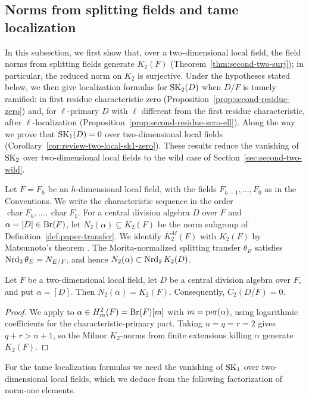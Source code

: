 \subsection{Norms from splitting fields and tame localization}\label{sec:second-two-tame}
In this subsection, we first show that, over a two-dimensional local field, the field norms from splitting fields generate $K_2(F)$ (Theorem~\ref{thm:second-two-surj}); in particular, the reduced norm on $K_2$ is surjective.
Under the hypotheses stated below, we then give localization formulas for $\operatorname{SK}_2(D)$ when $D/F$ is tamely ramified: in first residue characteristic zero (Proposition~\ref{prop:second-residue-zero}) and, for $\ell$-primary $D$ with $\ell$ different from the first residue characteristic, after $\ell$-localization (Proposition~\ref{prop:second-residue-zero-ell}).
Along the way we prove that $\operatorname{SK}_1(D)=0$ over two-dimensional local fields (Corollary~\ref{cor:review-two-local-sk1-zero}).
These results reduce the vanishing of $\operatorname{SK}_2$ over two-dimensional local fields to the wild case of Section~\ref{sec:second-two-wild}.

Let $F=F_h$ be an $h$-dimensional local field, with the fields $F_{h-1},\ldots,F_0$ as in the Conventions.
We write the characteristic sequence in the order $\operatorname{char} F_h,\ldots,\operatorname{char} F_1$.
For a central division algebra $D$ over $F$ and $\alpha=[D]\in\operatorname{Br}(F)$, let $N_2(\alpha)\subseteq K_2(F)$ be the norm subgroup of Definition~\ref{def:paper-transfer}.
We identify $K_2^M(F)$ with $K_2(F)$ by Matsumoto's theorem \cite{Matsumoto}.
The Morita-normalized splitting transfer $\theta_E$ satisfies $\operatorname{Nrd}_2\theta_E=N_{E/F}$, and hence $N_2(\alpha)\subset\operatorname{Nrd}_2K_2(D)$.

\begin{theorem}\label{thm:second-two-surj}
Let $F$ be a two-dimensional local field, let $D$ be a central division algebra over $F$, and put $\alpha=[D]$.
Then $N_2(\alpha)=K_2(F)$.
Consequently, $C_2(D/F)=0$.
\end{theorem}
\begin{proof}
We apply \cite[Proposition 5]{KatoExistence} to $\alpha\in H_m^2(F)=\operatorname{Br}(F)[m]$ with $m=\operatorname{per}(\alpha)$, using logarithmic coefficients for the characteristic-primary part.
Taking $n=q=r=2$ gives $q+r>n+1$, so the Milnor $K_2$-norms from finite extensions killing $\alpha$ generate $K_2(F)$.
\end{proof}

For the tame localization formulas we need the vanishing of $\operatorname{SK}_1$ over two-dimensional local fields, which we deduce from the following factorization of norm-one elements.

